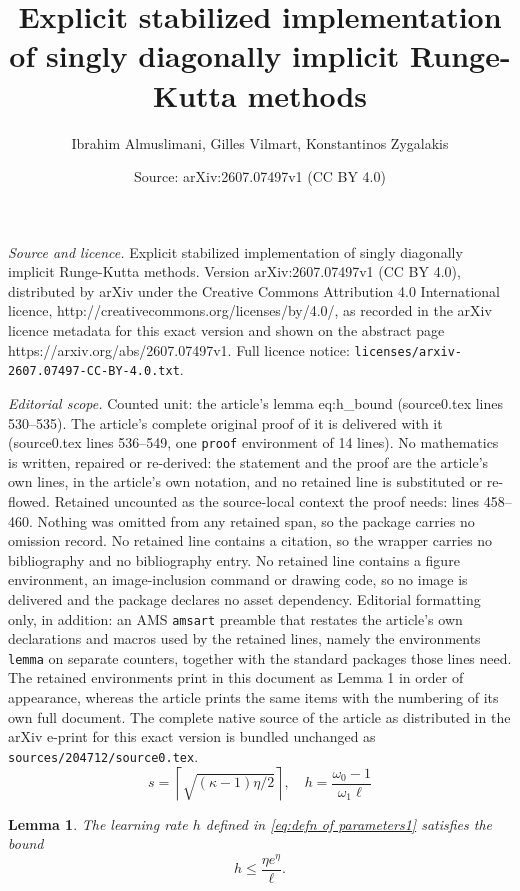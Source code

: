 \documentclass[10pt,a4paper]{amsart}
\title{Explicit stabilized implementation of singly diagonally implicit Runge-Kutta methods}
\author{Ibrahim Almuslimani, Gilles Vilmart, Konstantinos Zygalakis}
\date{Source: arXiv:2607.07497v1 (CC BY 4.0)}
\newtheorem{lemma}{Lemma}
\begin{document}
\maketitle

\noindent\emph{Source and licence.} Explicit stabilized implementation of singly diagonally implicit Runge-Kutta methods. Version arXiv:2607.07497v1 (CC BY 4.0), distributed by arXiv under the Creative Commons Attribution 4.0 International licence, http://creativecommons.org/licenses/by/4.0/, as recorded in the arXiv licence metadata for this exact version and shown on the abstract page https://arxiv.org/abs/2607.07497v1. Full licence notice: \texttt{licenses/arxiv-2607.07497-CC-BY-4.0.txt}.\par\smallskip

\noindent\textit{Editorial scope.} Counted unit: the article's lemma eq:h\_bound (source0.tex lines 530--535). The article's complete original proof of it is delivered with it (source0.tex lines 536--549, one \texttt{proof} environment of 14 lines). No mathematics is written, repaired or re-derived: the statement and the proof are the article's own lines, in the article's own notation, and no retained line is substituted or re-flowed.  Retained uncounted as the source-local context the proof needs: lines 458--460.  Nothing was omitted from any retained span, so the package carries no omission record.  No retained line contains a citation, so the wrapper carries no bibliography and no bibliography entry.  No retained line contains a figure environment, an image-inclusion command or drawing code, so no image is delivered and the package declares no asset dependency.  Editorial formatting only, in addition: an AMS \texttt{amsart} preamble that restates the article's own declarations and macros used by the retained lines, namely the environments \texttt{lemma} on separate counters, together with the standard packages those lines need.  The retained environments print in this document as Lemma 1 in order of appearance, whereas the article prints the same items with the numbering of its own full document.  The complete native source of the article as distributed in the arXiv e-print for this exact version is bundled unchanged as \texttt{sources/204712/source0.tex}.
  \begin{equation}  \label{eq:defn of parameters1}
  s=\left\lceil\sqrt{(\kappa-1)\eta/2}\right\rceil,\quad h=\frac{\omega_0-1}{\omega_1\ell}
  \end{equation}

\begin{lemma}
The learning rate $h$ defined in \eqref{eq:defn of parameters1} satisfies the bound
\begin{equation} \label{eq:h_bound}
h\leq \frac{\eta e^\eta}{\ell}.
   \end{equation}
\end{lemma}
\end{document}
